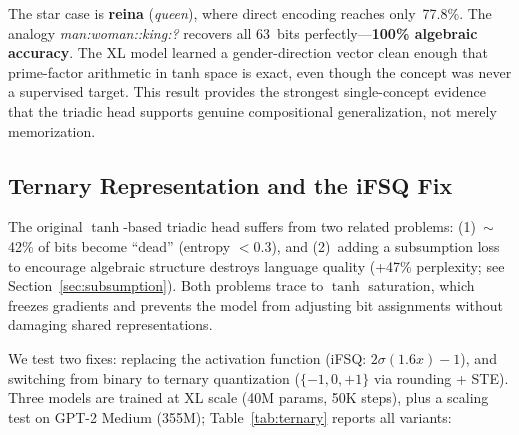 \documentclass[11pt,a4paper]{article}
\begin{document}
The star case is \textbf{reina} (\emph{queen}), where direct encoding reaches only~77.8\%.
The analogy \emph{man{:}woman{::}king{:}?} recovers all 63~bits perfectly---\textbf{100\% algebraic accuracy}. The XL model learned a gender-direction vector clean enough that prime-factor arithmetic in tanh space is exact, even though the concept was never a supervised target. This result provides the strongest single-concept evidence that the triadic head supports genuine compositional generalization, not merely memorization.


\subsection{Ternary Representation and the iFSQ Fix}
\label{sec:ternary}

The original $\tanh$-based triadic head suffers from two related problems: (1)~$\sim$42\% of bits become ``dead'' (entropy $< 0.3$), and (2)~adding a subsumption loss to encourage algebraic structure destroys language quality (+47\% perplexity; see Section~\ref{sec:subsumption}). Both problems trace to $\tanh$ saturation, which freezes gradients and prevents the model from adjusting bit assignments without damaging shared representations.

We test two fixes: replacing the activation function (iFSQ: $2\sigma(1.6x)-1$), and switching from binary to ternary quantization ($\{-1, 0, +1\}$ via rounding + STE). Three models are trained at XL scale (40M params, 50K steps), plus a scaling test on GPT-2 Medium (355M); Table~\ref{tab:ternary} reports all variants:
\end{document}
